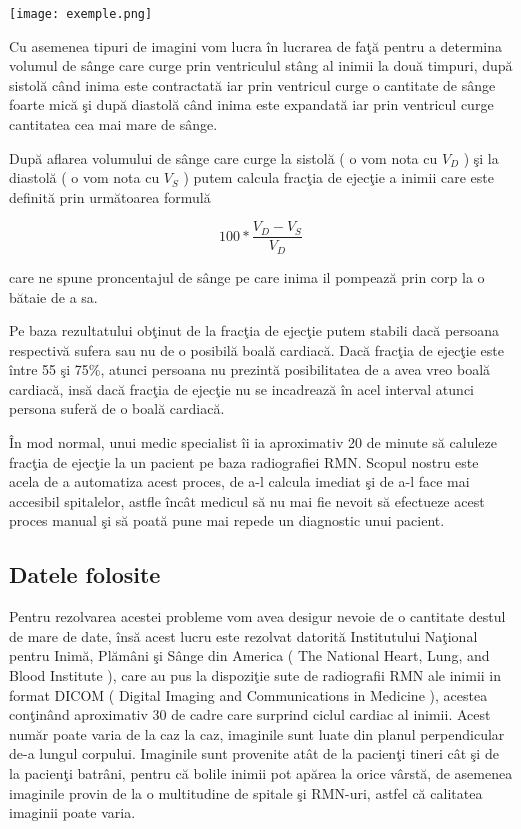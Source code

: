 \begin{center}
\texttt{[image: exemple.png]}
\end{center}

Cu asemenea tipuri de imagini vom lucra \^{i}n lucrarea de fa\c{t}\u{a} pentru a determina volumul de s\^{a}nge care curge prin ventriculul st\^{a}ng al inimii la dou\u{a} timpuri, dup\u{a} sistol\u{a} c\^{a}nd inima este contractat\u{a} iar prin ventricul curge o cantitate de s\^{a}nge foarte mic\u{a} \c{s}i dup\u{a} diastol\u{a} c\^{a}nd inima este expandat\u{a} iar prin ventricul curge cantitatea cea mai mare de s\^{a}nge.
\par
Dup\u{a} aflarea volumului de s\^{a}nge care curge la sistol\u{a} ( o vom nota cu \textbf{\textit{$V_D$}} ) \c{s}i la diastol\u{a} ( o vom nota cu \textbf{\textit{$V_S$}} ) putem calcula frac\c{t}ia de ejec\c{t}ie a inimii care este definit\u{a} prin urm\u{a}toarea formul\u{a}

$$100 * \frac{V_D - V_S}{V_D}$$

care ne spune proncentajul de s\^{a}nge pe care inima il pompeaz\u{a} prin corp la o b\u{a}taie de a sa.
\par
Pe baza rezultatului ob\c{t}inut de la frac\c{t}ia de ejec\c{t}ie putem stabili dac\u{a} persoana respectiv\u{a} sufera sau nu de o posibil\u{a} boal\u{a} cardiac\u{a}. Dac\u{a} frac\c{t}ia de ejec\c{t}ie este \^{i}ntre 55 \c{s}i 75\%, atunci persoana nu prezint\u{a} posibilitatea de a avea vreo boal\u{a} cardiac\u{a}, ins\u{a} dac\u{a} frac\c{t}ia de ejec\c{t}ie nu se incadreaz\u{a} \^{i}n acel interval atunci persona sufer\u{a} de o boal\u{a} cardiac\u{a}.
\par
\^{I}n mod normal, unui medic specialist \^{i}i ia aproximativ 20 de minute s\u{a} caluleze frac\c{t}ia de ejec\c{t}ie la un pacient pe baza radiografiei RMN. Scopul nostru este acela de a automatiza acest proces, de a-l calcula imediat \c{s}i de a-l face mai accesibil spitalelor, astfle \^{i}nc\^{a}t medicul s\u{a} nu mai fie nevoit s\u{a} efectueze acest proces manual \c{s}i s\u{a} poat\u{a} pune mai repede un diagnostic unui pacient.

\subsection{Datele folosite}

Pentru rezolvarea acestei probleme vom avea desigur nevoie de o cantitate destul de mare de date, \^{i}ns\u{a} acest lucru este rezolvat datorit\u{a} Institutului Na\c{t}ional pentru Inim\u{a}, Pl\u{a}m\^{a}ni \c{s}i S\^{a}nge din America ( The National Heart, Lung, and Blood Institute ), care au pus la dispozi\c{t}ie sute de radiografii RMN ale inimii in format DICOM ( Digital Imaging and Communications in Medicine ), acestea con\c{t}in\^{a}nd aproximativ 30 de cadre care surprind ciclul cardiac al inimii. Acest num\u{a}r poate varia de la caz la caz, imaginile sunt luate din planul perpendicular de-a lungul corpului. Imaginile sunt provenite at\^{a}t de la pacien\c{t}i tineri c\^{a}t \c{s}i de la pacien\c{t}i batr\^{a}ni, pentru c\u{a} bolile inimii pot ap\u{a}rea la orice v\^{a}rst\u{a}, de asemenea imaginile provin de la o multitudine de spitale \c{s}i RMN-uri, astfel c\u{a} calitatea imaginii poate varia.


